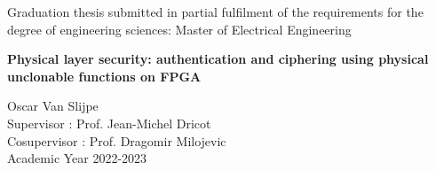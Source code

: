 \begin{titlepage}

\begin{onehalfspace}
\begin{center}


\vspace{9.2cm}
{\large \textsf{Graduation thesis submitted in partial fulﬁlment of the requirements for
the degree of engineering sciences: Master of Electrical Engineering
}}
\HRule \\[0.4cm]

\begin{doublespace}
{\LARGE \textbf{\textsf{Physical layer security: authentication and ciphering using physical unclonable functions on FPGA}}}
\HRule \\[0.5cm]
\end{doublespace}

\textsf{\Large Oscar Van Slijpe}\\[1.5cm]


\textsf{\Large Supervisor : Prof. Jean-Michel Dricot}\\[0.2cm]
\textsf{\Large Cosupervisor : Prof. Dragomir Milojevic}\\[2.5cm]

\vfill
\textsf{\large Academic Year 2022-2023}

\end{center}
\end{onehalfspace}

\end{titlepage}